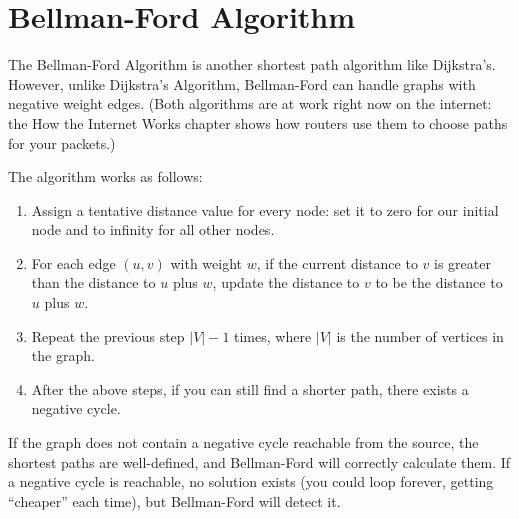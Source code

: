 




\section{Bellman-Ford Algorithm}
The Bellman-Ford Algorithm is another shortest path algorithm like
Dijkstra's. However, unlike Dijkstra's Algorithm, Bellman-Ford can
handle graphs with negative weight edges.
(Both algorithms are at work right now on the internet: the How the
Internet Works chapter shows how routers use them to choose paths for
your packets.)


The algorithm works as follows:

\begin{enumerate}
    \item Assign a tentative distance value for every node: set it to
      zero for our initial node and to infinity for all other nodes.
    \item For each edge $(u, v)$ with weight $w$, if the current
      distance to $v$ is greater than the distance to $u$ plus $w$,
      update the distance to $v$ to be the distance to $u$ plus $w$.
    \item Repeat the previous step $|V| - 1$ times, where $|V|$ is the
      number of vertices in the graph.
    \item After the above steps, if you can still find a shorter path,
      there exists a negative cycle.
\end{enumerate}

If the graph does not contain a negative cycle reachable from the
source, the shortest paths are well-defined, and Bellman-Ford will
correctly calculate them. If a negative cycle is reachable, no
solution exists (you could loop forever, getting ``cheaper'' each time),
but Bellman-Ford will detect it.

